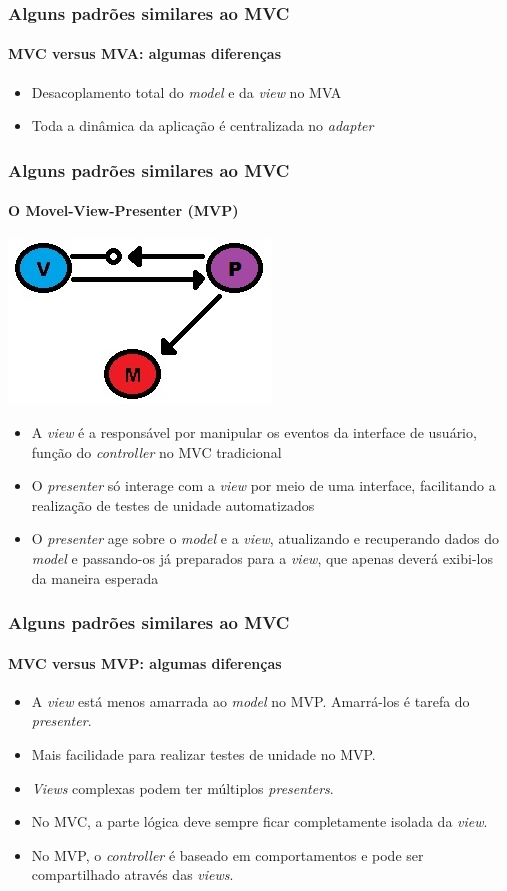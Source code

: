\documentclass{beamer}
\begin{document}
\begin{frame}
\frametitle{Alguns padrões similares ao MVC}
\framesubtitle{MVC versus MVA: algumas diferenças}
\begin{itemize}
	\item Desacoplamento total do \textit{model} e da \textit{view} no MVA
	\item Toda a dinâmica da aplicação é centralizada no \textit{adapter}
\end{itemize}
\end{frame}

\begin{frame}
\frametitle{Alguns padrões similares ao MVC}
\framesubtitle{O Movel-View-Presenter (MVP)}
	\begin{center}
		\includegraphics[scale=0.3]{MVP.jpg}
	\end{center}
	\begin{itemize}
    \item A \textit{view} é a responsável por manipular os eventos da interface de usuário, função do \textit{controller} no MVC tradicional
    \item O \textit{presenter} só interage com a \textit{view} por meio de uma interface, facilitando a realização de testes de unidade automatizados
    \item O \textit{presenter} age sobre o \textit{model} e a \textit{view}, atualizando e recuperando dados do \textit{model} e passando-os já preparados para a \textit{view}, que apenas deverá exibi-los da maneira esperada
\end{itemize}
\end{frame}

\begin{frame}
\frametitle{Alguns padrões similares ao MVC}
\framesubtitle{MVC versus MVP: algumas diferenças}
\begin{itemize}
	\item A \textit{view} está menos amarrada ao \textit{model} no MVP. Amarrá-los é tarefa do \textit{presenter}.\\
	\item Mais facilidade para realizar testes de unidade no MVP.\\
	\item \textit{Views} complexas podem ter múltiplos \textit{presenters}.
	\item No MVC, a parte lógica deve sempre ficar completamente isolada da \textit{view}.
	\item No MVP, o \textit{controller} é baseado em comportamentos e pode ser compartilhado através das \textit{views}.
\end{itemize}
\end{frame}
\end{document}
